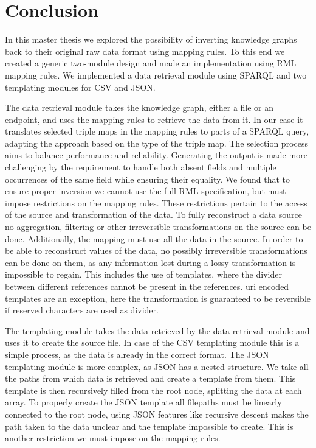\chapter{Conclusion}
\label{chapter:conclusion}
In this master thesis we explored the possibility of inverting knowledge graphs back to their original raw data format using mapping rules. To this end we created a generic two-module design and made an implementation using RML mapping rules. We implemented a data retrieval module using SPARQL and two templating modules for CSV and JSON. 

The data retrieval module takes the knowledge graph, either a file or an endpoint, and uses the mapping rules to retrieve the data from it. In our case it translates selected triple maps in the mapping rules to parts of a SPARQL query, adapting the approach based on the type of the triple map. The selection process aims to balance performance and reliability. Generating the output is made more challenging by the requirement to handle both absent fields and multiple occurrences of the same field while ensuring their equality. We found that to ensure proper inversion we cannot use the full RML specification, but must impose restrictions on the mapping rules. These restrictions pertain to the access of the source and transformation of the data. 
To fully reconstruct a data source no aggregation, filtering or other irreversible transformations on the source can be done. Additionally, the mapping must use all the data in the source. 
In order to be able to reconstruct values of the data, no possibly irreversible transformations can be done on them, as any information lost during a lossy transformation is impossible to regain. This includes the use of templates, where the divider between different references cannot be present in the references. \acrshort{uri} encoded templates are an exception, here the transformation is guaranteed to be reversible if reserved characters are used as divider.

The templating module takes the data retrieved by the data retrieval module and uses it to create the source file. In case of the CSV templating module this is a simple process, as the data is already in the correct format. The JSON templating module is more complex, as JSON has a nested structure. We take all the paths from which data is retrieved and create a template from them. This template is then recursively filled from the root node, splitting the data at each array. To properly create the JSON template all filepaths must be linearly connected to the root node, using JSON features like recursive descent makes the path taken to the data unclear and the template impossible to create. This is another restriction we must impose on the mapping rules.

